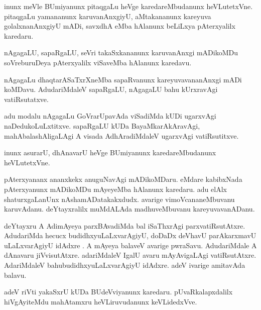 \documentclass{article}
\begin{document}
\begin{mn}
inunx meVle BUmiyanunx pitaqgaLu heVge karedareMbudanunx heVLutetxVne.  
pitaqgaLu yamananunx karuvanAnxgiyU, aMtakananunx kareyuva golalxnanAnxgiyU 
mADi, savxdhA eMba hAlanunx beLiLxya pAterxyalilx karedaru.
\end{mn}

\begin{mn}
nAgagaLU, sapaRgaLU, seVri takaSxkananunx karuvanAnxgi mADikoMDu soVreburuDeya 
pAterxyalilx viSaveMba hAlanunx karedavu.
\end{mn}

\begin{mn}
nAgagaLu dhaqtarASaTxrXneMba sapaRvanunx kareyuvavananAnxgi mADi koMDavu. 
AdudariMdaleV sapaRgaLU, nAgagaLU bahu kUrxravAgi vatiRsutatxve.
\end{mn}

\begin{mn}
adu modalu nAgagaLu GoVrarUpavAda viSadiMda  kUDi ugarxvAgi naDedukoLuLxtitxve.  
sapaRgaLU kUDa BayaMkarAkAravAgi, mahAbalashAligaLAgi A visada AdhAradiMdaleV 
ugarxvAgi vatiRsutitxve.  
\end{mn}

\begin{mn}
inunx asurarU, dhAnavarU heVge BUmiyanunx karedareMbudanunx heVLutetxVne. 
\end{mn}

\begin{mn}
pAterxyananx ananxkekx anuguNavAgi mADikoMDaru. eMdare kabibxNada pAterxyanunx 
mADikoMDu mAyeyeMba hAlanunx karedaru. adu elAlx shaturxgaLanUnx nAshamADatakakxdudx.  
avarige vimoVcananeMbuvanu karuvAdanu.  deYtayxralilx muMdALAda madhuveMbuvanu kareyuvavanADanu.
\end{mn}

\begin{mn}
deYtayxru A AdimAyeya parxBAvadiMda bal	iSaThxrAgi parxvatiRsutAtxre. 
AdudariMda hecucx budidhxyuLaLxvarAgiyU, doDaDx deVhavU parAkarxmavU 
uLaLxvarAgiyU idAdxre .  A mAyeya balaveV avarige pwraSavu.  AdudariMdale 
A dAnavaru jiVvisutAtxre.  adariMdaleV IgalU avaru mAyAvigaLAgi vatiRsutAtxre. 
AdariMdaleV bahubudidhxyuLaLxvarAgiyU idAdxre. adeV ivarige amitavAda balavu.
\end{mn}

\begin{mn}
adeV riVti yakaSxrU kUDa BUdeVviyanunx karedaru.  pUvaRkalapxdalilx hiVgAyiteMdu  
mahAtamxru heVLiruvudanunx keVLidedxVve.
\end{mn}
\end{document}
